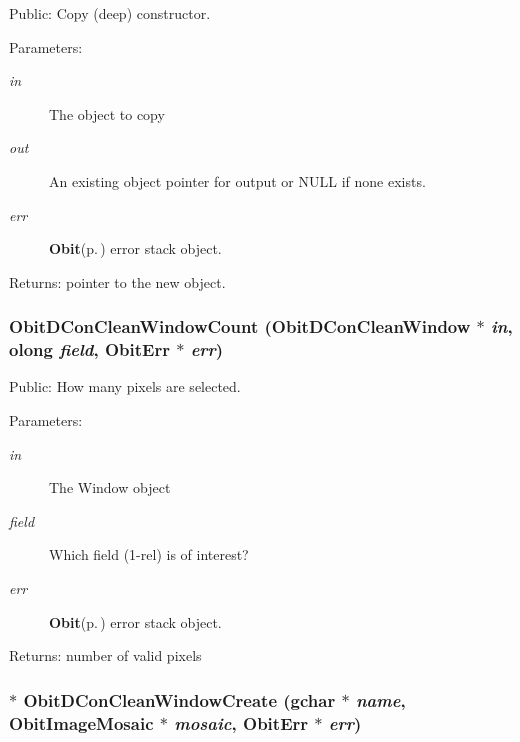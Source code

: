 Public: Copy (deep) constructor. 

\begin{Desc}
\item[Parameters:]
\begin{description}
\item[{\em in}]The object to copy \item[{\em out}]An existing object pointer for output or NULL if none exists. \item[{\em err}]{\bf Obit}{\rm (p.\,\pageref{structObit})} error stack object. \end{description}
\end{Desc}
\begin{Desc}
\item[Returns:]pointer to the new object. \end{Desc}
\subsubsection{ Obit\-DCon\-Clean\-Window\-Count ({\bf Obit\-DCon\-Clean\-Window} $\ast$ {\em in}, {\bf olong} {\em field}, {\bf Obit\-Err} $\ast$ {\em err})}\label{ObitDConCleanWindow_8c_a29}


Public: How many pixels are selected. 

\begin{Desc}
\item[Parameters:]
\begin{description}
\item[{\em in}]The Window object \item[{\em field}]Which field (1-rel) is of interest? \item[{\em err}]{\bf Obit}{\rm (p.\,\pageref{structObit})} error stack object. \end{description}
\end{Desc}
\begin{Desc}
\item[Returns:]number of valid pixels \end{Desc}
\subsubsection{$\ast$ Obit\-DCon\-Clean\-Window\-Create (gchar $\ast$ {\em name}, {\bf Obit\-Image\-Mosaic} $\ast$ {\em mosaic}, {\bf Obit\-Err} $\ast$ {\em err})}\label{ObitDConCleanWindow_8c_a15}


